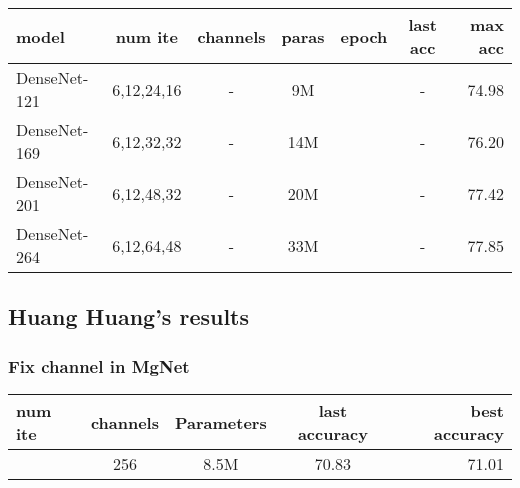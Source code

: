 \begin{table}[H]
	\begin{tabular}{| l | c | c | c | c | c | r |}
		\hline
		model          &   num ite                 &      channels          &     paras   &   epoch      &    last  acc  &  max  acc \\
		\hline
		DenseNet-121   &   6,12,24,16              &  -                     &     9M      &              &    -          & 74.98     \\
		\hline
		DenseNet-169   &   6,12,32,32              &  -                     &     14M     &              &    -          & 76.20     \\
		\hline
		DenseNet-201   &   6,12,48,32              &  -                     &     20M     &              &    -          & 77.42     \\
		\hline
		DenseNet-264   &   6,12,64,48              &  -                     &     33M     &              &    -          & 77.85     \\
		\hline
	\end{tabular}
\end{table}
\subsection{Huang Huang's results}
\subsubsection{Fix channel in MgNet}
\begin{table}[H]
	\begin{tabular}{| l | c | c | c | r |}
		\hline
		num ite    &      channels      &    Parameters   &   last accuracy   &  best accuracy  \\
		\hline
		[2,2,2,2]   &         256        &    8.5M         &   70.83           &  71.01          \\
		\hline
	\end{tabular}
\end{table}

